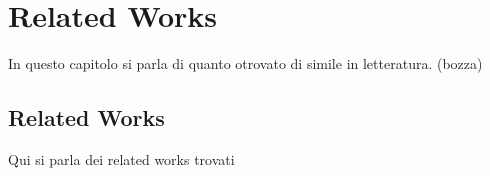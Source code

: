 \chapter{Related Works}
\label{cap:RelatedWorks}

In questo capitolo si parla di quanto otrovato di simile in letteratura. (bozza)
\section{Related Works}

Qui si parla dei related works trovati


